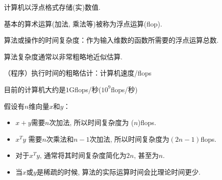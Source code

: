 计算机以浮点格式存储(实)数值. 

基本的算术运算(加法, 乘法等)被称为浮点运算(flop). 

算法或操作的时间复杂度：作为输入维数的函数所需要的浮点运算总数. 

算法复杂度通常以非常粗略地近似估算. 

（程序）执行时间的粗略估计：计算机速度/flops

目前的计算机大约是$1$Gflops/秒($10^9$flops/秒)

\begin{corollary}
    假设有$n$维向量$x$和$y$：

    \begin{itemize}
        \item $x+y$需要$n$次加法, 所以时间复杂度为 ($n$)flops. 
        \item $x^T y$ 需要$n$次乘法和$n - 1$次加法, 所以时间复杂度为$(2n - 1)$flops. 
        \item 对于$x^T y$, 通常将其时间复杂度简化为$2n$, 甚至为$n$. 
        \item 当$x$或$y$是稀疏的时候, 算法的实际运算时间会比理论时间更少. 
    \end{itemize}
\end{corollary}



